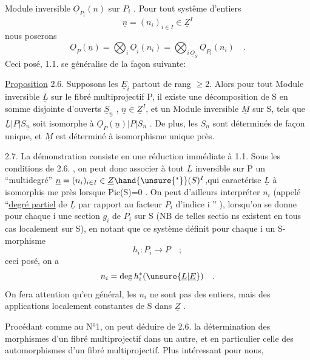 
Module inversible $\underline{O}_{P_i}(n)$ sur $P_i$ . Pour tout systême d'entiers
\[ \underline{n} = (n_i)_{i \in I} \in \underline{Z}^I \]
nous  poserons
\[ \underline{O}_P(\underline{n}) = \bigotimes_i \underline{O}_i(n_i) = \bigotimes_{i\,\underline{O}_S} \underline{O}_{P_i}(n_i) \quad . \]
Ceci posé, 1.1. se généralise de la façon suivante:

\uline{Proposition} 2.6. Supposons les $\underline{E}_i$ partout de rang $\geq$2. Alors pour tout
Module inversible $\underline{L}$ sur le fibré multiprojectif P, il existe une
 décomposition de S en somme disjointe d'ouverts $\underline{S}_{\underline{n}}$ , $\underline{n} \in \underline{Z}^I$,
et  un Module inversible $\underline{M}$ sur S, tels que $\underline{L}|P|S_{\underline{n}}$
soit isomorphe à $\underline{O}_P(\underline{n})|P|S_n$ . De plus, les $S_{\underline{n}}$ sont déterminés de façon
unique, et  $\underline{M}$ est déterminé à isomorphisme unique près.

2.7. La démonstration  consiste en une réduction immédiate à 1.1.
Sous les conditions de 2.6. , on peut donc associer à tout $\underline{L}$ inversible
sur P un ``multidegré'' $\underline{n} = (n_i)_{i \in I} \in \underline{Z}\hand{\unsure{^{*}}}(S)^I$,qui caractérise $\underline{L}$ à isomorphis
me près lorsque Pic(S)=0 . On peut d'ailleurs interpréter $n_i$ (appelé
``\uline{degré partiel} de $\underline{L}$ par rapport au facteur $P_i$ d'indice i '' ), lorsqu'on
se donne pour chaque i une section $g_i$ de $P_i$ sur S (NB de telles sectio
ns existent en tous cas localement sur S), en notant que ce système définit
pour chaque i un S-morphisme 
\[ h_i : P_i \longrightarrow P \quad ; \]
ceci posé, on a
\[ n_i = \deg h_i^{*}(\unsure{\underline{L}|\underline{E}}) \quad . \]
On fera attention qu'en général, les $n_i$ ne sont pas des entiers, mais des
applications localement constantes de S dans $\underline{Z}$ .

Procédant comme au N°1, on peut déduire de 2.6. la détermination des
morphismes d'un fibré multiprojectif dans un autre, et en particulier celle
des automorphismes d'un fibré multiprojectif. Plus intéressant pour nous,

